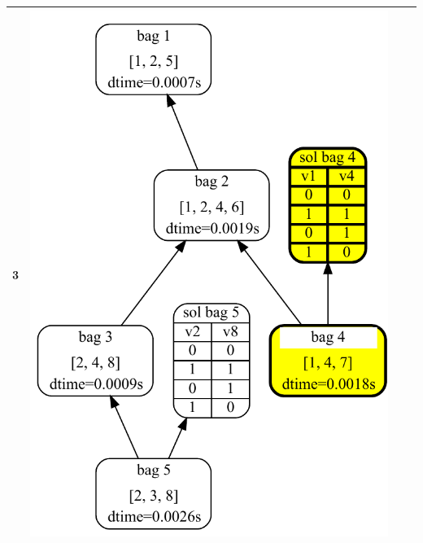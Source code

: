 \documentclass[a4paper, 12pt, bibliography=totoc]{scrartcl}
\begin{document}
\begin{table}
\begin{tabular}{l*3{c}}
	3 & \includegraphics[height=0.46\textheight]{images/DA4SAT/results/TDStep3.pdf} \\ 
	\midrule

\end{tabular}
\end{table}
\end{document}
